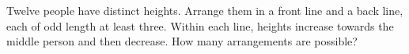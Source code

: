 Twelve people have distinct heights. Arrange them in a front line and a back line, each of odd length at least three. Within each line, heights increase towards the middle person and then decrease. How many arrangements are possible?
